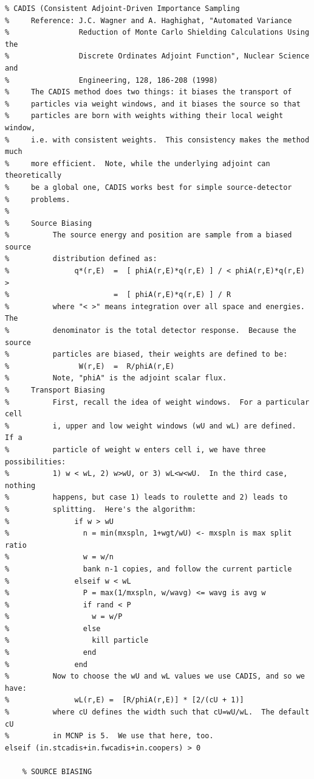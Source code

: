 \documentclass[letter,11pt]{article}
\begin{document}
{\begin{verbatim}
% CADIS (Consistent Adjoint-Driven Importance Sampling
%     Reference: J.C. Wagner and A. Haghighat, "Automated Variance
%                Reduction of Monte Carlo Shielding Calculations Using the
%                Discrete Ordinates Adjoint Function", Nuclear Science and
%                Engineering, 128, 186-208 (1998)
%     The CADIS method does two things: it biases the transport of
%     particles via weight windows, and it biases the source so that
%     particles are born with weights withing their local weight window,
%     i.e. with consistent weights.  This consistency makes the method much
%     more efficient.  Note, while the underlying adjoint can theoretically
%     be a global one, CADIS works best for simple source-detector
%     problems.
%
%     Source Biasing
%          The source energy and position are sample from a biased source
%          distribution defined as:
%               q*(r,E)  =  [ phiA(r,E)*q(r,E) ] / < phiA(r,E)*q(r,E) >
%                        =  [ phiA(r,E)*q(r,E) ] / R
%          where "< >" means integration over all space and energies.  The
%          denominator is the total detector response.  Because the source
%          particles are biased, their weights are defined to be:
%                W(r,E)  =  R/phiA(r,E)
%          Note, "phiA" is the adjoint scalar flux.
%     Transport Biasing
%          First, recall the idea of weight windows.  For a particular cell
%          i, upper and low weight windows (wU and wL) are defined.  If a
%          particle of weight w enters cell i, we have three possibilities:
%          1) w < wL, 2) w>wU, or 3) wL<w<wU.  In the third case, nothing
%          happens, but case 1) leads to roulette and 2) leads to
%          splitting.  Here's the algorithm:
%               if w > wU
%                 n = min(mxspln, 1+wgt/wU) <- mxspln is max split ratio
%                 w = w/n
%                 bank n-1 copies, and follow the current particle
%               elseif w < wL
%                 P = max(1/mxspln, w/wavg) <= wavg is avg w 
%                 if rand < P
%                   w = w/P
%                 else
%                   kill particle
%                 end
%               end
%          Now to choose the wU and wL values we use CADIS, and so we have:
%               wL(r,E) =  [R/phiA(r,E)] * [2/(cU + 1)] 
%          where cU defines the width such that cU=wU/wL.  The default cU
%          in MCNP is 5.  We use that here, too.
elseif (in.stcadis+in.fwcadis+in.coopers) > 0
    
    % SOURCE BIASING
    

\end{verbatim}}
\end{document}
